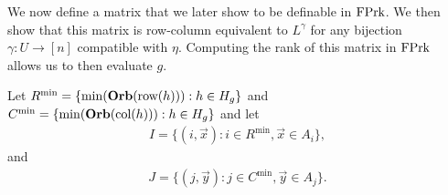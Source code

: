 \documentclass[../paper.tex]{subfiles}
\begin{document}





We now define a matrix that we later show to be definable in $\text{\upshape FPrk}$. We then
show that this matrix is row-column equivalent to $L^{\gamma}$ for any bijection
$\gamma: U \rightarrow [n]$ compatible with $\eta$. Computing the rank of this
matrix in $\text{\upshape FPrk}$ allows us to then evaluate $g$.

Let $R^{\min} = \{\min (\text{\textbf{Orb}}(\text{row}(h))) : h \in H_g\}$ and $C^{\min} = \{ \min
(\text{\textbf{Orb}} (\text{col}(h))) : h \in H_g\}$ and let
\begin{align*}
  I = \{(i, \vec{x}): i \in R^{\min}, \vec{x} \in A_i\},
\end{align*}
and
\begin{align*}
  J = \{(j, \vec{y}): j \in C^{\min}, \vec{y} \in A_j\}.
\end{align*}


\end{document}
